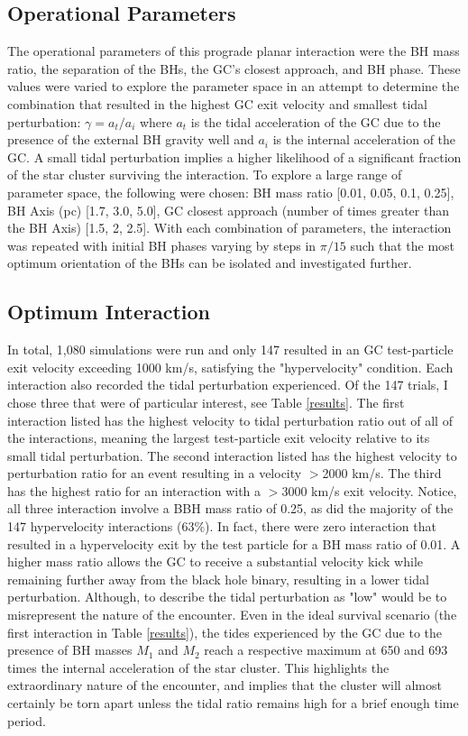 \documentclass{aastex62}
\begin{document}
\subsection{Operational Parameters}
The operational parameters of this prograde planar interaction were the BH mass ratio, the separation of the BHs, the GC's closest approach, and BH phase. These values were varied to explore the parameter space in an attempt to determine the combination that resulted in the highest GC exit velocity and smallest tidal perturbation: $\gamma = {a_{t}}/{a_i}$ where $a_{t}$ is the tidal acceleration of the GC due to the presence of the external BH gravity well and $a_{i}$ is the internal acceleration of the GC. A small tidal perturbation implies a higher likelihood of a significant fraction of the star cluster surviving the interaction. To explore a large range of parameter space, the following were chosen: BH mass ratio [0.01, 0.05, 0.1, 0.25], BH Axis (pc) [1.7, 3.0, 5.0], GC closest approach (number of times greater than the BH Axis) [1.5, 2, 2.5]. With each combination of parameters, the interaction was repeated with initial BH phases varying by steps in $\pi/15$ such that the most optimum orientation of the BHs can be isolated and investigated further. 

\subsection{Optimum Interaction}
In total, 1,080 simulations were run and only 147 resulted in an GC test-particle exit velocity exceeding 1000 km/s, satisfying the "hypervelocity" condition. Each interaction also recorded the tidal perturbation experienced. Of the 147 trials, I chose three that were of particular interest, see Table \ref{results}. The first interaction listed has the highest velocity to tidal perturbation ratio out of all of the interactions, meaning the largest test-particle exit velocity relative to its small tidal perturbation. The second interaction listed has the highest velocity to perturbation ratio for an event resulting in a velocity $>$2000 km/s. The third has the highest ratio for an interaction with a $>$3000 km/s exit velocity. Notice, all three interaction involve a BBH mass ratio of 0.25, as did the majority of the 147 hypervelocity interactions (63$\%$). In fact, there were zero interaction that resulted in a hypervelocity exit by the test particle for a BH mass ratio of 0.01. A higher mass ratio allows the GC to receive a substantial velocity kick while remaining further away from the black hole binary, resulting in a lower tidal perturbation.  Although, to describe the tidal perturbation as "low" would be to misrepresent the nature of the encounter. Even in the ideal survival scenario (the first interaction in Table \ref{results}), the tides experienced by the GC due to the presence of BH masses $M_{1}$ and $M_{2}$ reach a respective maximum at 650 and 693 times the internal acceleration of the star cluster. This highlights the extraordinary nature of the encounter, and implies that the cluster will almost certainly be torn apart unless the tidal ratio remains high for a brief enough time period. 
\end{document}
